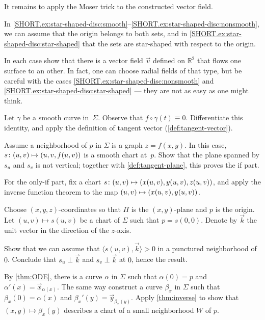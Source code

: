 It remains to apply the Moser trick to the constructed vector field. 

In \ref{SHORT.ex:star-shaped-disc:smooth}--\ref{SHORT.ex:star-shaped-disc:nonsmooth}, we can assume that the origin belongs to both sets, and in \ref{SHORT.ex:star-shaped-disc:star-shaped} that the sets are star-shaped with respect to the origin. 

In each case show that there is a vector field $\vec v$ defined on $\mathbb{R}^2$ that flows one surface to an other.
In fact, one can choose radial fields of that type,
but be careful with the cases \ref{SHORT.ex:star-shaped-disc:nonsmooth} and \ref{SHORT.ex:star-shaped-disc:star-shaped} --- they are not as easy as one might think.


\setcounter{eqtn}{0}

Let $\gamma$ be a smooth curve in~$\Sigma$.
Observe that $f\circ\gamma(t)\equiv 0$.
Differentiate this identity, and apply the definition of tangent vector (\ref{def:tangent-vector}).

Assume a neighborhood of $p$ in $\Sigma$ is a graph $z=f(x,y)$.
In this case, $s\:(u,v)\z\mapsto (u,v,f(u,v))$ is a smooth chart at~$p$.
Show that the plane spanned by $s_u$ and $s_v$ is not vertical;
together with \ref{def:tangent-plane}, this proves the if part.

For the only-if part, fix a chart 
$s\:(u,v)\z\mapsto(x(u,v),y(u,v),z(u,v))$,
and apply the inverse function theorem to the map $(u,v)\z\mapsto(x(u,v),y(u,v))$.

Choose $(x,y,z)$-coordinates so that $\Pi$ is the $(x,y)$-plane and $p$ is the origin.
Let $(u,v)\mapsto s(u,v)$ be a chart of $\Sigma$ such that $p=s(0,0)$.
Denote by $\vec k$ the unit vector in the direction of the $z$-axis.

Show that we can assume that $\langle s(u,v),\vec k\rangle>0$ in a punctured neighborhood of $0$.
Conclude that $s_u\perp \vec k$ and $s_v\perp \vec k$ at
$0$, hence the result.

By \ref{thm:ODE}, there is a curve $\alpha$ in $\Sigma$ such that $\alpha(0)=p$ and $\alpha'(x)=\vec x_{\alpha(x)}$.
The same way construct a curve $\beta_x$ in $\Sigma$ such that $\beta_x(0)=\alpha(x)$ and $\beta_x'(y)=\vec y_{\beta_x(y)}$.
Apply \ref{thm:inverse} to show that $(x,y)\mapsto \beta_x(y)$ describes a chart of a small neighborhood $W$ of $p$.

